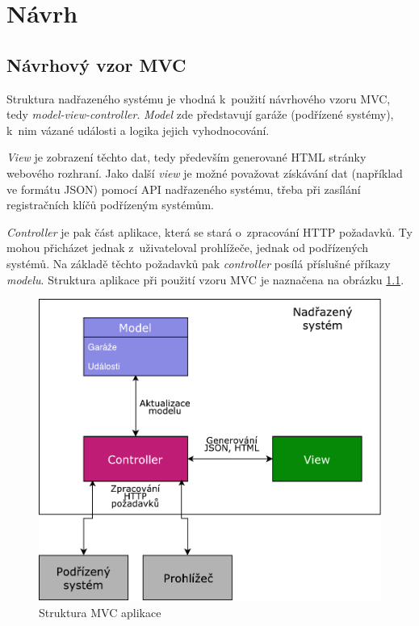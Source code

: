 \chapter{Návrh}
\label{sec:de}

\section{Návrhový vzor MVC}
\label{sec:de_mvc}

Struktura nadřazeného systému je vhodná k~použití návrhového vzoru MVC, tedy \textit{model-view-controller}. \textit{Model} zde představují garáže (podřízené systémy), k~nim vázané události a logika jejich vyhodnocování. 

\textit{View} je zobrazení těchto dat, tedy především generované HTML stránky webového rozhraní. Jako další \textit{view} je možné považovat získávání dat (například ve formátu JSON) pomocí API nadřazeného systému, třeba při zasílání registračních klíčů podřízeným systémům.

\textit{Controller} je pak část aplikace, která se stará o~zpracování HTTP požadavků. Ty mohou přicházet jednak z~uživateloval prohlížeče, jednak od podřízených systémů. Na základě těchto požadavků pak \textit{controller} posílá příslušné příkazy \textit{modelu}. Struktura aplikace při použití vzoru MVC je naznačena na obrázku \ref{fig:mvc}.

\begin{figure}[h!]
    \centering
    \includegraphics[width=\textwidth]{images/mvc.pdf}
    \caption{Struktura MVC aplikace}
    \label{fig:mvc}
\end{figure}

